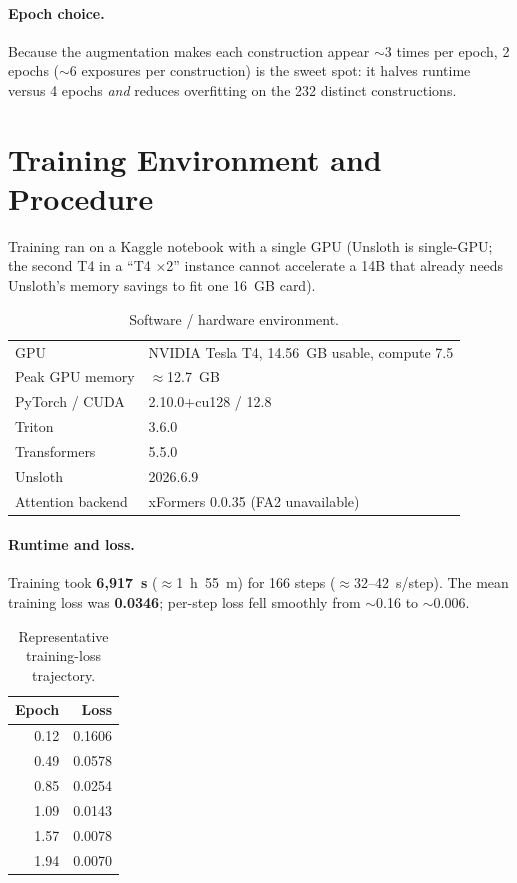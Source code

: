 \documentclass[11pt]{article}
\begin{document}
\paragraph{Epoch choice.} Because the augmentation makes each construction appear $\sim$3 times
per epoch, 2 epochs ($\sim$6 exposures per construction) is the sweet spot: it halves runtime
versus 4 epochs \emph{and} reduces overfitting on the 232 distinct constructions.

\section{Training Environment and Procedure}
Training ran on a Kaggle notebook with a single GPU (Unsloth is single-GPU; the second T4 in a
``T4 $\times$2'' instance cannot accelerate a 14B that already needs Unsloth's memory savings
to fit one 16~GB card).

\begin{table}[h]
\centering
\caption{Software / hardware environment.}
\begin{tabular}{ll}
\toprule
GPU & NVIDIA Tesla T4, 14.56~GB usable, compute 7.5 \\
Peak GPU memory & $\approx$12.7~GB \\
PyTorch / CUDA & 2.10.0+cu128 / 12.8 \\
Triton & 3.6.0 \\
Transformers & 5.5.0 \\
Unsloth & 2026.6.9 \\
Attention backend & xFormers 0.0.35 (FA2 unavailable) \\
\bottomrule
\end{tabular}
\end{table}

\paragraph{Runtime and loss.} Training took \textbf{6{,}917~s} ($\approx$1~h~55~m) for 166
steps ($\approx$32--42~s/step). The mean training loss was \textbf{0.0346}; per-step loss fell
smoothly from $\sim$0.16 to $\sim$0.006.

\begin{table}[h]
\centering
\caption{Representative training-loss trajectory.}
\begin{tabular}{rr}
\toprule
\textbf{Epoch} & \textbf{Loss} \\
\midrule
0.12 & 0.1606 \\
0.49 & 0.0578 \\
0.85 & 0.0254 \\
1.09 & 0.0143 \\
1.57 & 0.0078 \\
1.94 & 0.0070 \\
\bottomrule
\end{tabular}
\end{table}
\end{document}
